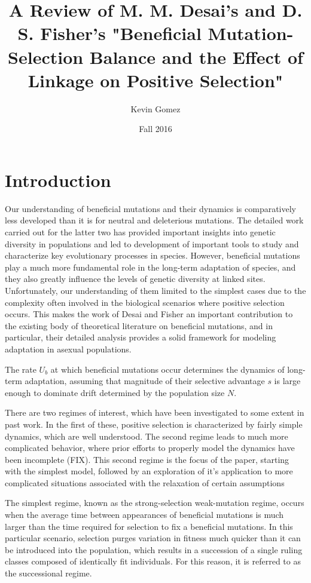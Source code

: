 \documentclass[12pt,twocolumn]{article}
\title{A Review of M. M. Desai's and D. S. Fisher's "Beneficial Mutation-Selection Balance and the Effect of Linkage on Positive Selection"}
\date{Fall 2016}
\author{Kevin Gomez}
\begin{document}
\maketitle
\newpage


\newpage
\section{Introduction}
Our understanding of beneficial mutations and their dynamics is comparatively less developed than it is for neutral and deleterious mutations.  The detailed work carried out for the latter two has provided important insights into genetic diversity in populations and led to development of important tools to study and characterize key evolutionary processes in species.  However, beneficial mutations play a much more fundamental role in the long-term adaptation of species, and they also greatly influence the levels of genetic diversity at linked sites.  Unfortunately, our understanding of them limited to the simplest cases due to the complexity often involved in the biological scenarios where positive selection occurs.  This makes the work of Desai and Fisher an important contribution to the existing body of theoretical literature on beneficial mutations, and in particular, their detailed analysis provides a solid framework for modeling adaptation in asexual populations.  

The rate $U_b$ at which beneficial mutations occur determines the dynamics of long-term adaptation, assuming that magnitude of their selective advantage $s$ is large enough to dominate drift determined by the population size $N$. 

There are two regimes of interest, which have been investigated to some extent in past work.  In the first of these, positive selection is characterized by fairly simple dynamics, which are well understood.  The second regime leads to much more complicated behavior, where prior efforts to properly model the dynamics have been incomplete (FIX).  This second regime is the focus of the paper, starting with the simplest model, followed by an exploration of it's application to more complicated situations associated with the relaxation of certain assumptions      

The simplest regime, known as the strong-selection weak-mutation regime, occurs when the average time between appearances of beneficial mutations is much larger than the time required for selection to fix a beneficial mutations.  In this particular scenario, selection purges variation in fitness much quicker than it can be introduced into the population, which results in a succession of a single ruling classes composed of identically fit individuals.  For this reason, it is referred to as the successional regime.  
\end{document}
